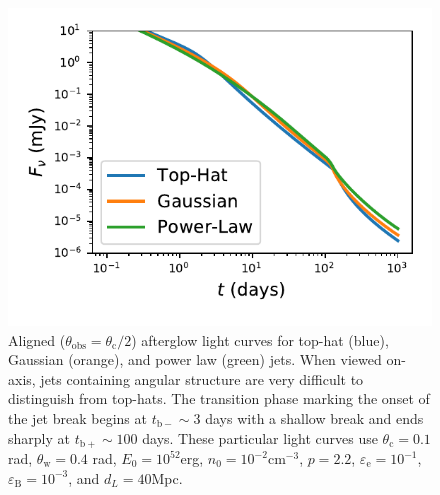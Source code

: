 \documentclass[twocolumn]{aastex62}
\newcommand{\tbm}{\ensuremath{t_{\mathrm{b-}}}}
\newcommand{\tbp}{\ensuremath{t_{\mathrm{b+}}}}
\newcommand{\thobs}{\ensuremath{\theta_{\mathrm{obs}}}}
\newcommand{\thW}{\ensuremath{\theta_{\mathrm{w}}}}
\newcommand{\thC}{\ensuremath{\theta_{\mathrm{c}}}}
\newcommand{\epse}{\ensuremath{\varepsilon_{\mathrm{e}}}}
\newcommand{\epsB}{\ensuremath{\varepsilon_{\mathrm{B}}}}
\begin{document}
\begin{figure}
	\includegraphics[width=\columnwidth]{figs/lc_on.pdf}
	\caption{Aligned ($\thobs = \thC/2$) afterglow light curves for top-hat (blue), Gaussian (orange), and power law (green) jets. When viewed on-axis, jets containing angular structure are very difficult to distinguish from top-hats.  The transition phase marking the onset of the jet break begins at $\tbm\sim3$ days with a shallow break and ends sharply at $\tbp \sim 100$ days.  These particular light curves use $\thC = 0.1$ rad, $\thW = 0.4$ rad, $E_0 = 10^{52}$erg, $n_0=10^{-2}$cm$^{-3}$, $p=2.2$, $\epse = 10^{-1}$, $\epsB = 10^{-3}$, and $d_L=40$Mpc. \label{fig:onaxis}}
\end{figure}
\end{document}
